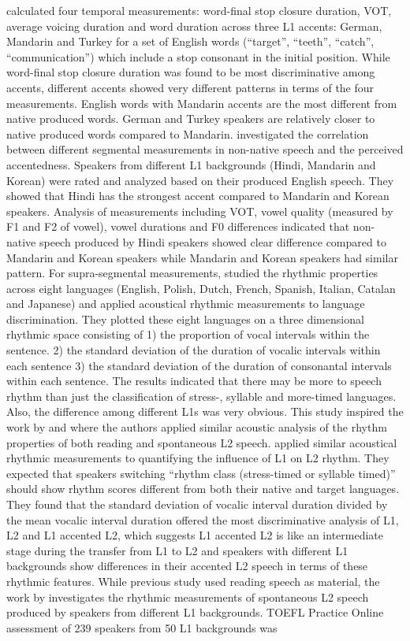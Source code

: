 \cite{arslan1997study} calculated four temporal measurements: word-final stop closure duration, VOT, average voicing duration and word duration across three L1 accents: German, Mandarin and Turkey for a set of English words (``target'', ``teeth'', ``catch'', ``communication'') which include a stop consonant in the initial position. While word-final stop closure duration was found to be most discriminative among accents, different accents showed very different patterns in terms of the four measurements. English words with Mandarin accents are the most different from native produced words. German and Turkey speakers are relatively closer to native produced words compared to Mandarin. \cite{mccullough2013perceived} investigated the correlation between different segmental measurements in non-native speech and the perceived accentedness. Speakers from different L1 backgrounds (Hindi, Mandarin and Korean) were rated and analyzed based on their produced English speech. They showed that Hindi has the strongest accent compared to Mandarin and Korean speakers. Analysis of measurements including VOT, vowel quality (measured by F1 and F2 of vowel), vowel durations and F0 differences indicated that non-native speech produced by Hindi speakers showed clear difference compared to Mandarin and Korean speakers while Mandarin and Korean speakers had similar pattern. For supra-segmental measurements, \cite{ramus1999correlates} studied the rhythmic properties across eight languages (English, Polish, Dutch, French, Spanish, Italian, Catalan and Japanese) and applied acoustical rhythmic measurements to language discrimination. They plotted these eight languages on a three dimensional rhythmic space consisting of 1) the proportion of vocal intervals within the sentence. 2) the standard deviation of the duration of vocalic intervals within each sentence 3) the standard deviation of the duration of consonantal intervals within each sentence. The results indicated that there may be more to speech rhythm than just the classification of stress-, syllable and more-timed languages. Also, the difference among different L1s was very obvious. This study inspired the work by \cite{white2007calibrating} and \cite{lai2013applying} where the authors applied similar acoustic analysis of the rhythm properties of both reading and spontaneous L2 speech. \cite{white2007calibrating} applied similar acoustical rhythmic measurements to quantifying the influence of L1 on L2 rhythm. They expected that speakers switching ``rhythm class (stress-timed or syllable timed)'' should show rhythm scores different from both their native and target languages. They found that the standard deviation of vocalic interval duration divided by the mean vocalic interval duration offered the most discriminative analysis of L1, L2 and L1 accented L2, which suggests L1 accented L2 is like an intermediate stage during the transfer from L1 to L2 and speakers with different L1 backgrounds show differences in their accented L2 speech in terms of these rhythmic features. While previous study used reading speech as material, the work by \cite{lai2013applying} investigates the rhythmic measurements of spontaneous L2 speech produced by speakers from different L1 backgrounds. TOEFL Practice Online assessment of 239 speakers from 50 L1 backgrounds was 